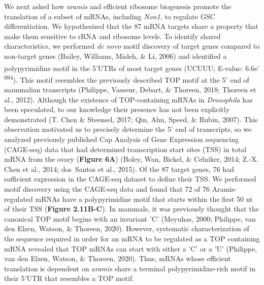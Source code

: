 \documentclass[12pt,oneside]{reedthesis}
\begin{document}
We next asked how \emph{aramis} and efficient ribosome biogenesis promote the translation of a subset of mRNAs, including \emph{Non1}, to regulate GSC differentiation. We hypothesized that the 87 mRNA targets share a property that make them sensitive to rRNA and ribosome levels. To identify shared characteristics, we performed \emph{de novo} motif discovery of target genes compared to non-target genes (Bailey, Williams, Misleh, \& Li, 2006) and identified a polypyrimidine motif in the 5'UTRs of most target genes (UCUUU; E-value: 6.6e\textsuperscript{-094}). This motif resembles the previously described TOP motif at the 5' end of mammalian transcripts (Philippe, Vasseur, Debart, \& Thoreen, 2018; Thoreen et al., 2012). Although the existence of TOP-containing mRNAs in \emph{Drosophila} has been speculated, to our knowledge their presence has not been explicitly demonstrated (T. Chen \& Steensel, 2017; Qin, Ahn, Speed, \& Rubin, 2007). This observation motivated us to precisely determine the 5' end of transcripts, so we analyzed previously published Cap Analysis of Gene Expression sequencing (CAGE-seq) data that had determined transcription start sites (TSS) in total mRNA from the ovary (\textbf{Figure 6A}) (Boley, Wan, Bickel, \& Celniker, 2014; Z.-X. Chen et al., 2014; dos~Santos et al., 2015). Of the 87 target genes, 76 had sufficient expression in the CAGE-seq dataset to define their TSS. We performed motif discovery using the CAGE-seq data and found that 72 of 76 Aramis-regulated mRNAs have a polypyrimidine motif that starts within the first 50 nt of their TSS (\textbf{Figure 2.11B-C}). In mammals, it was previously thought that the canonical TOP motif begins with an invariant 'C' (Meyuhas, 2000; Philippe, van den Elzen, Watson, \& Thoreen, 2020). However, systematic characterization of the sequence required in order for an mRNA to be regulated as a TOP containing mRNA revealed that TOP mRNAs can start with either a 'C' or a 'U' (Philippe, van den Elzen, Watson, \& Thoreen, 2020). Thus, mRNAs whose efficient translation is dependent on \emph{aramis} share a terminal polypyrimidine-rich motif in their 5'UTR that resembles a TOP motif.
\end{document}
